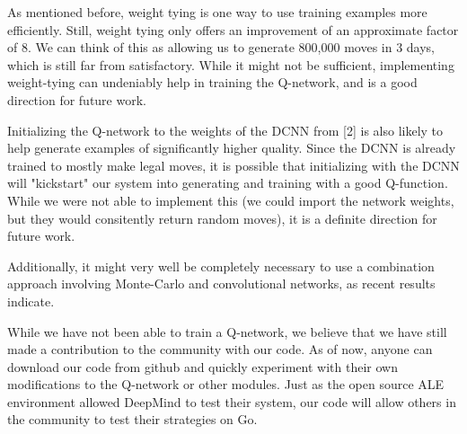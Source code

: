 As mentioned before, weight tying is one way to use training examples more efficiently. Still, weight tying only offers an improvement of an approximate factor of 8. We can think of this as allowing us to generate 800,000 moves in 3 days, which is still far from satisfactory. While it might not be sufficient, implementing weight-tying can undeniably help in training the Q-network, and is a good direction for future work.

Initializing the Q-network to the weights of the DCNN from [2] is also likely to help generate examples of significantly higher quality. Since the DCNN is already trained to mostly make legal moves, it is possible that initializing with the DCNN will "kickstart" our system into generating and training with a good Q-function. While we were not able to implement this (we could import the network weights, but they would consitently return random moves), it is a definite direction for future work.

Additionally, it might very well be completely necessary to use a combination approach involving Monte-Carlo and convolutional networks, as recent results indicate. 

While we have not been able to train a Q-network, we believe that we have still made a contribution to the community with our code. As of now, anyone can download our code from github and quickly experiment with their own modifications to the Q-network or other modules. Just as the open source ALE environment allowed DeepMind to test their system, our code will allow others in the community to test their strategies on Go.
